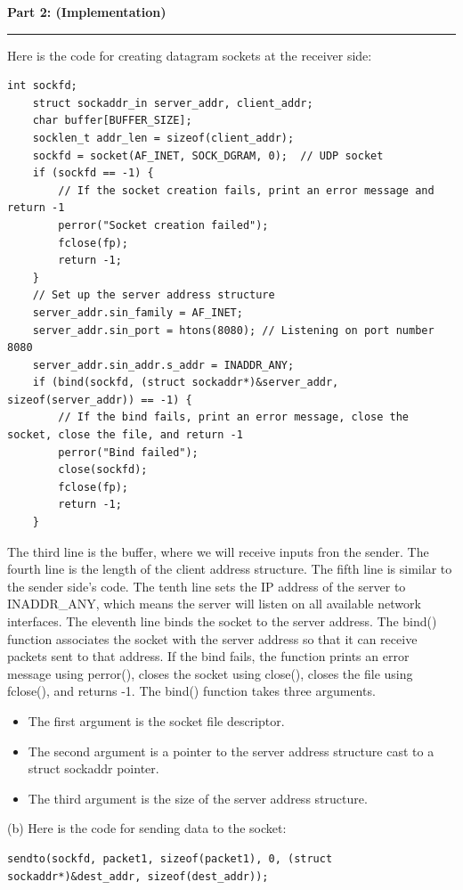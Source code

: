 \documentclass[a4paper,12pt]{article}
\newenvironment{solution}[2][]{%
    \begin{mdframed}[linecolor=blue!70!black, linewidth=2pt, roundcorner=10pt, backgroundcolor=yellow!10!white, skipabove=12pt, skipbelow=12pt]%
        \textbf{\large #2}
        \par\noindent\rule{\textwidth}{0.4pt}
}{
    \end{mdframed}
}
\begin{document}
\begin{solution}{Part 2: (Implementation)}
Here is the code for creating datagram sockets at the receiver side:
\begin{lstlisting}[caption=Sender Datagram Socket Creation]
    int sockfd;
    struct sockaddr_in server_addr, client_addr;
    char buffer[BUFFER_SIZE];
    socklen_t addr_len = sizeof(client_addr);
    sockfd = socket(AF_INET, SOCK_DGRAM, 0);  // UDP socket
    if (sockfd == -1) {
        // If the socket creation fails, print an error message and return -1
        perror("Socket creation failed");
        fclose(fp);
        return -1;
    }
    // Set up the server address structure
    server_addr.sin_family = AF_INET;
    server_addr.sin_port = htons(8080); // Listening on port number 8080
    server_addr.sin_addr.s_addr = INADDR_ANY;
    if (bind(sockfd, (struct sockaddr*)&server_addr, sizeof(server_addr)) == -1) {
        // If the bind fails, print an error message, close the socket, close the file, and return -1
        perror("Bind failed");
        close(sockfd);
        fclose(fp);
        return -1;
    }
\end{lstlisting}

The third line is the buffer, where we will receive inputs fron the sender. The fourth line is the length of the client address structure. The fifth line is similar to the sender side's code. The tenth line sets the IP address of the server to INADDR\_ANY, which means the server will listen on all available network interfaces. The eleventh line binds the socket to the server address. The bind() function associates the socket with the server address so that it can receive packets sent to that address. If the bind fails, the function prints an error message using perror(), closes the socket using close(), closes the file using fclose(), and returns -1. The bind() function takes three arguments.
\begin{itemize}
    \item The first argument is the socket file descriptor.
    \item The second argument is a pointer to the server address structure cast to a struct sockaddr pointer.
    \item The third argument is the size of the server address structure.
\end{itemize}


(b) Here is the code for sending data to the socket:

\begin{lstlisting}[caption=Sending Data to the Socket]
    sendto(sockfd, packet1, sizeof(packet1), 0, (struct sockaddr*)&dest_addr, sizeof(dest_addr));
\end{lstlisting}


\end{solution}
\end{document}
